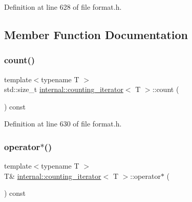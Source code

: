 Definition at line 628 of file format.\+h.



\subsection{Member Function Documentation}
\mbox{\label{classinternal_1_1counting__iterator_a452e9d9c9038962166ddb7be18d2f029}} 
\subsubsection{\texorpdfstring{count()}{count()}}
{\footnotesize\ttfamily template$<$typename T $>$ \\
std\+::size\+\_\+t \hyperlink{classinternal_1_1counting__iterator}{internal\+::counting\+\_\+iterator}$<$ T $>$\+::count (\begin{DoxyParamCaption}{ }\end{DoxyParamCaption}) const\hspace{0.3cm}{\ttfamily [inline]}}



Definition at line 630 of file format.\+h.

\mbox{\label{classinternal_1_1counting__iterator_a2e24e30b8971f6662bcc4eac695a9d36}} 
\subsubsection{\texorpdfstring{operator$\ast$()}{operator*()}}
{\footnotesize\ttfamily template$<$typename T $>$ \\
T\& \hyperlink{classinternal_1_1counting__iterator}{internal\+::counting\+\_\+iterator}$<$ T $>$\+::operator$\ast$ (\begin{DoxyParamCaption}{ }\end{DoxyParamCaption}) const\hspace{0.3cm}{\ttfamily [inline]}}



